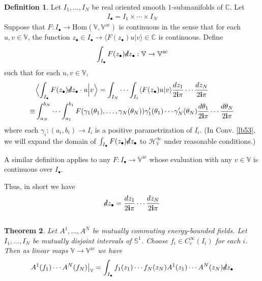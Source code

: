 \documentclass[12pt,b5paper,notitlepage]{article}
\theoremstyle{definition}
\newtheorem{df}{Definition}[section]
\theoremstyle{plain}
\newtheorem{thm}[df]{Theorem}
\newcommand{\Hom}{\mathrm{Hom}}
\newcommand{\bk}[1]{\langle {#1}\rangle}
\newcommand{\Bigbk}[1]{\Big\langle {#1}\Big\rangle}
\newcommand{\im}{\mathbf{i}}
\newcommand{\blt}{\bullet}
\newcommand{\Vbb}{\mathbb V}
\newcommand{\Cbb}{\mathbb C}
\newcommand{\Sbb}{{\mathbb S}}
\newcommand{\HV}{\mathcal H_{\mathbb V}}
\newcommand{\sd}{\slashed{d}}
\newcommand{\ac}{\mathrm{ac}}
\numberwithin{equation}{section}
\begin{document}
\begin{df}\label{lb52}
Let $I_1,\dots,I_N$ be real oriented smooth $1$-submanifolds of $\Cbb$. Let \index{I@$I_\blt=I_1\times\cdots\times I_N$} 
\begin{align*}
I_\blt=I_1\times\cdots\times I_N
\end{align*}
Suppose that $F:I_\blt\rightarrow\Hom(\Vbb,\Vbb^\ac)$ is continuous in the sense that for each $u,v\in\Vbb$, the function $z_\blt\in I_\blt\rightarrow\bk{F(z_\blt)u|v}\in\Cbb$ is continuous. Define \index{zz@$\int_{I_\blt}F(z_\blt)\sd z_\blt$}
\begin{gather*}
\int_{I_\blt}F(z_\blt)\sd z_\blt:\Vbb\rightarrow\Vbb^\ac
\end{gather*}
such that for each $u,v\in\Vbb$,
\begin{align}
\begin{aligned}
&\Bigbk{\int_{I_\blt}F(z_\blt)\sd z_\blt\cdot u\Big| v}=\int_{I_N}\cdots\int_{I_1}\bk{F(z_\blt)u|v}\frac{dz_1}{2\im\pi}\cdots \frac{dz_N}{2\im\pi}\\
\equiv&\int_{a_N}^{b_N}\cdots \int_{a_1}^{b_1}F(\gamma_1(\theta_1),\dots,\gamma_N(\theta_N))\gamma_1'(\theta_1)\cdots\gamma_N'(\theta_N)\frac{d\theta_1}{2\im\pi}\cdots \frac{d\theta_N}{2\im\pi}
\end{aligned}
\end{align}
where each $\gamma_i:(a_i,b_i)\rightarrow I_i$ is a positive parametrization of $I_i$. (In Conv. \ref{lb53}, we will expand the domain of $\int_{I_\blt}F(z_\blt)\sd z_\blt$ to $\HV^\infty$ under reasonable conditions.)

A similar definition applies to any $F:I_\blt\rightarrow\Vbb^\ac$ whose evaluation with any $v\in\Vbb$ is continuous over $I_\blt$.  \hfill\qedsymbol
\end{df}

Thus, in short we have \index{dz@$\sd z_\blt$}
\begin{align*}
\sd z_\blt=\frac{dz_1}{2\im\pi}\cdots \frac{dz_N}{2\im\pi}
\end{align*}


\subsection{}


\begin{thm}\label{lb50}
Let $A^1,\dots,A^N$ be mutually commuting energy-bounded fields. Let $I_1,\dots,I_N$ be mutually disjoint intervals of $\Sbb^1$. Choose $f_i\in C_c^\infty(I_i)$ for each $i$. Then as linear maps $\Vbb\rightarrow\Vbb^\ac$ we have
\begin{align}\label{eq71}
A^1(f_1)\cdots A^N(f_N)\big|_{\Vbb}=\int_{I_\blt} f_1(z_1)\cdots f_N(z_N)A^1(z_1)\cdots A^N(z_N)\sd z_\blt
\end{align}
\end{thm}
\end{document}
